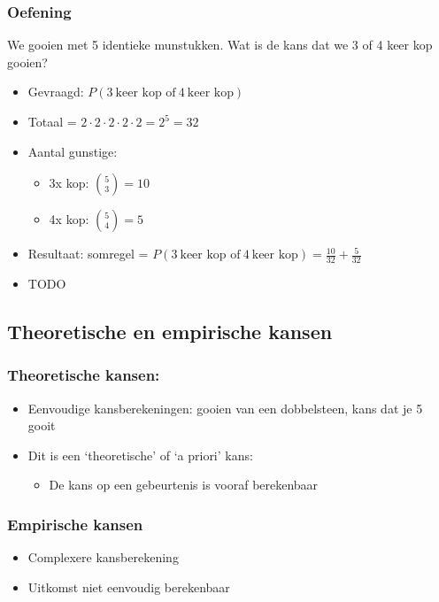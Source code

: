 \documentclass{article}
\begin{document}
\subsubsection{Oefening}

We gooien met 5 identieke munstukken. Wat is de kans dat we 3 of 4 keer kop gooien?

\begin{itemize}
    \item Gevraagd: $P(3\ \text{keer kop of}\ 4\ \text{keer kop})$
    \item Totaal = $2 \cdot 2 \cdot 2 \cdot 2 \cdot 2 = 2^5 = 32$
    \item Aantal gunstige:
    \begin{itemize}
        \item 3x kop: $\binom{5}{3} = 10$
        \item 4x kop: $\binom{5}{4} = 5$
    \end{itemize}
    \item Resultaat: somregel = $P(3\ \text{keer kop of}\ 4\ \text{keer kop}) = \frac{10}{32} + \frac{5}{32}$
    \item TODO
\end{itemize}

\subsection{Theoretische en empirische kansen}

\subsubsection{Theoretische kansen:}

\begin{itemize}
    \item Eenvoudige kansberekeningen: gooien van een dobbelsteen, kans dat je 5 gooit
    \item Dit is een `theoretische' of `a priori' kans:
    \begin{itemize}
        \item De kans op een gebeurtenis is vooraf berekenbaar
    \end{itemize}
\end{itemize}

\subsubsection{Empirische kansen}

\begin{itemize}
    \item Complexere kansberekening
    \item Uitkomst niet eenvoudig berekenbaar
\end{itemize}
\end{document}
